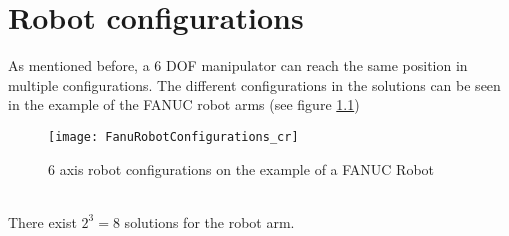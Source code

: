 \chapter{Robot configurations} \label{sec:RobConf}

As mentioned before, a 6 \ac{DOF} manipulator can reach the same position in multiple configurations.
The different configurations in the solutions can be seen in the example of the FANUC robot arms (see figure \ref{fig:RobotConfigs})
\medskip

\begin{figure}[H]
	\texttt{[image: FanuRobotConfigurations\_cr]}
	\caption{6 axis robot configurations on the example of a FANUC Robot \cite{QingFanucAcademy}}
	\label{fig:RobotConfigs}
\end{figure}
\phantom{}\\
There exist $2^3=8$ solutions for the robot arm.

\phantom{}\\

